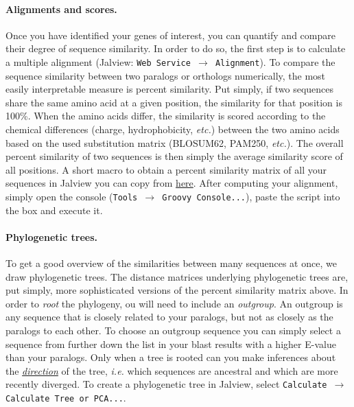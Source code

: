\documentclass[11pt]{article}
\begin{document}
	\paragraph*{Alignments and scores.} Once you have identified your genes of interest, you can quantify and compare their degree of sequence similarity.
	In order to do so, the first step is to calculate a multiple alignment (Jalview: \texttt{Web Service $\rightarrow$ Alignment}).
	To compare the sequence similarity between two paralogs or orthologs numerically, the most easily interpretable measure is percent similarity. 
	Put simply, if two sequences share the same amino acid at a given position, the similarity for that position is 100\%. 
	When the amino acids differ, the similarity is scored according to the chemical differences (charge, hydrophobicity, \textit{etc.}) between the two amino acids based on the used substitution matrix (BLOSUM62, PAM250, \textit{etc.}). 
	The overall percent similarity of two sequences is then simply the average similarity score of all positions. 
	A short macro to obtain a percent similarity matrix of all your sequences in Jalview you can copy from \href{https://github.com/leonardblaschek/teaching/blob/master/bioinformatics/jalview_simmat.txt}{here}. 
	After computing your alignment, simply open the console (\texttt{Tools $\rightarrow$ Groovy Console...}), paste the script into the box and execute it.
	
	\paragraph*{Phylogenetic trees.}To get a good overview of the similarities between many sequences at once, we draw phylogenetic trees. 
	The distance matrices underlying phylogenetic trees are, put simply, more sophisticated versions of the percent similarity matrix above. 
	In order to \textit{root} the phylogeny, ou will need to include an \textit{outgroup}. 
	An outgroup is any sequence that is closely related to your paralogs, but not as closely as the paralogs to each other. 
	To choose an outgroup sequence you can simply select a sequence from further down the list in your blast results with a higher E-value than your paralogs. 
	Only when a tree is rooted can you make inferences about the \href{https://evolution.berkeley.edu/evolibrary/article/evo_05}{\textit{direction}} of the tree, \textit{i.e.} which sequences are ancestral and which are more recently diverged. 
	To create a phylogenetic tree in Jalview, select \texttt{Calculate $\rightarrow$ Calculate Tree or PCA...}.
	
\end{document}

